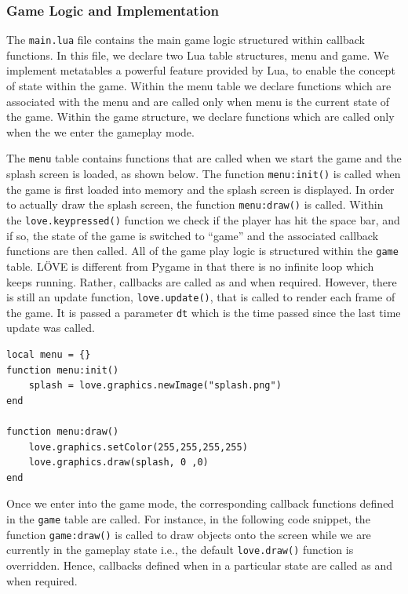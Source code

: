 	\subsubsection{Game Logic and Implementation}
	
	The \texttt{main.lua} file contains the main game logic structured within callback functions. In this file, we declare two Lua table structures, menu and game. We implement metatables a powerful feature provided by Lua, to enable the concept of state within the game. Within the menu table we declare functions which are associated with the menu and are called only when menu is the current state of the game. Within the game structure, we declare functions which are called only when the we enter the gameplay mode.

The \texttt{menu} table contains functions that are called when we start the game and the splash screen is loaded, as shown below. The function \texttt{menu:init()} is called when the game is first loaded into memory and the splash screen is displayed. In order to actually draw the splash screen, the function \texttt{menu:draw()} is called. Within the \texttt{love.keypressed()} function we check if the player has hit the space bar, and if so, the state of the game is switched to ``game'' and the associated callback functions are then called. All of the game play logic is structured within the \texttt{game} table. L\"OVE is different from Pygame in that there is no infinite loop which keeps running. Rather, callbacks are called as and when required. However, there is still an update function, \texttt{love.update()}, that is called to render each frame of the game. It is passed a parameter \texttt{dt} which is the time passed since the last time update was called.

\begin{lstlisting}[language={[5.2]Lua},caption=LuaLetterLizard \texttt{menu:init()} function,label=splash]
local menu = {}
function menu:init()
    splash = love.graphics.newImage("splash.png")
end

function menu:draw()
    love.graphics.setColor(255,255,255,255)
    love.graphics.draw(splash, 0 ,0)
end
\end{lstlisting}

Once we enter into the game mode, the corresponding callback functions defined in the \texttt{game} table are called. For instance, in the following code snippet, the function \texttt{game:draw()} is called to draw objects onto the screen while we are currently in the gameplay state i.e., the default \texttt{love.draw()} function is overridden. Hence, callbacks defined when in a particular state are called as and when required.

